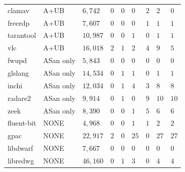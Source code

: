 \begin{table}[h!]
{\begin{tabular}{|l|l|l|l|l|l|l|l|l|}
clamav           & A+UB                & $6,742$             & $0$              & $0$           & $0$           & $2$            & $2$             & $0$                 \\
freerdp          & A+UB                & $7,607$             & $0$              & $0$           & $0$           & $1$            & $1$             & $1$                 \\
tarantool        & A+UB                & $10,987$            & $0$              & $0$           & $1$           & $0$            & $1$             & $1$                 \\
vlc              & A+UB                & $16,018$            & $2$              & $1$           & $2$           & $4$            & $9$             & $5$                 \\ 
\hline
fwupd            & ASan only                & $5,843$             & $0$              & $0$           & $0$           & $0$            & $0$             & $0$                 \\
glslang          & ASan only                & $14,534$            & $0$              & $1$           & $1$           & $0$            & $1$             & $1$                 \\
inchi            & ASan only                & $12,034$            & $0$              & $1$           & $4$           & $3$            & $8$             & $8$                 \\
radare2          & ASan only                & $9,914$             & $0$              & $1$           & $0$           & $9$            & $10$            & $10$                \\
zeek             & ASan only                & $8,390$             & $0$              & $0$           & $1$           & $5$            & $6$             & $6$                 \\ 
\hline
fluent-bit       & NONE                & $4,968$             & $0$              & $0$           & $1$           & $1$            & $2$             & $2$                 \\
gpac             & NONE                & $22,917$            & $2$         & $0$           & $25$          & $0$            & $27$            & $27$                \\
libdwarf         & NONE                & $7,667$             & $0$              & $0$           & $0$           & $0$            & $0$             & $0$                 \\
libredwg         & NONE                & $46,160$            & $0$              & $1$           & $3$           & $0$            & $4$             & $4$                 \\

\end{tabular}}
\end{table}

